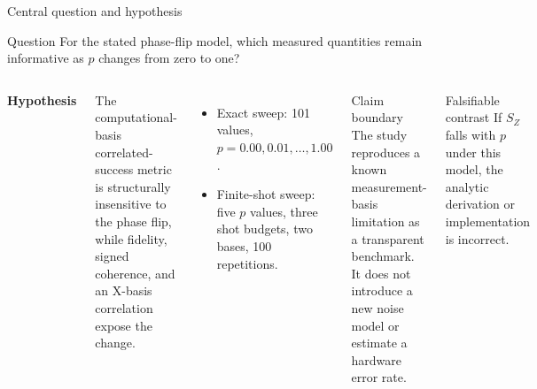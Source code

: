 \documentclass[10pt,aspectratio=169]{beamer}
\newcommand{\sourcefoot}[1]{}
\begin{document}
\begin{frame}[t]{Central question and hypothesis}
\begin{block}{Question}
For the stated phase-flip model, which measured quantities remain informative as $p$ changes from zero to one?
\end{block}
\begin{columns}[T]
\textbf{Hypothesis}\par
\vspace{1mm}
The computational-basis correlated-success metric is structurally insensitive to the phase flip, while fidelity, signed coherence, and an X-basis correlation expose the change.
\vspace{3mm}
\begin{itemize}
  \item Exact sweep: 101 values, $p=0.00,0.01,\ldots,1.00$.
  \item Finite-shot sweep: five $p$ values, three shot budgets, two bases, 100 repetitions.
\end{itemize}
\begin{block}{Claim boundary}
The study reproduces a known measurement-basis limitation as a transparent benchmark. It does not introduce a new noise model or estimate a hardware error rate.
\end{block}
\begin{block}{Falsifiable contrast}
If $S_Z$ falls with $p$ under this model, the analytic derivation or implementation is incorrect.
\end{block}
\end{columns}
\sourcefoot{Scope statement: \texttt{docs/self\_audit.md}; model: \texttt{paper/main.tex}.}
\end{frame}
\end{document}
